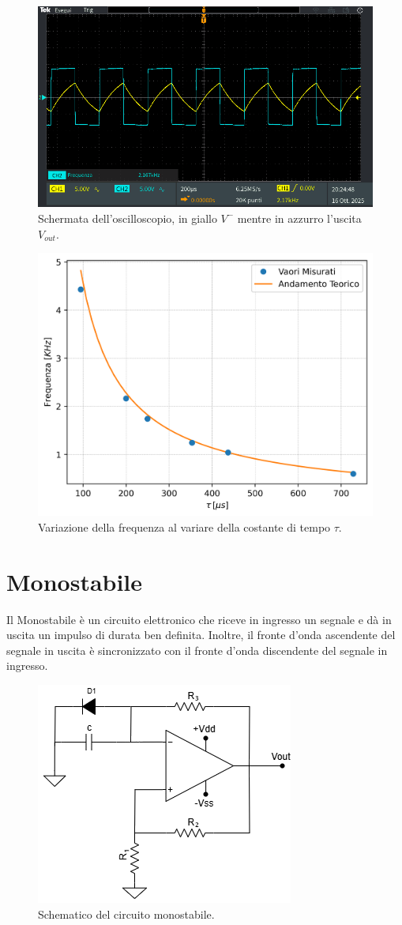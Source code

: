 \documentclass[a4paper,12pt]{article}
\begin{document}
\begin{figure}[h]
	\centering
	\includegraphics[width=0.7\linewidth]{immagini/ocillatore/oscillatore.PNG}
	\caption{Schermata dell'oscilloscopio, in giallo $V^-$ mentre in azzurro l'uscita $V_{out}$.}
	\label{fig:oscillatore}
\end{figure}

\begin{figure}[h]
	\centering
	\includegraphics[width=0.6\linewidth]{immagini/ocillatore/freq_tau.png}
	\caption{Variazione della frequenza al variare della costante di tempo $\tau$.}
	\label{fig:ocillatore_freq_tau}
\end{figure}
\FloatBarrier

\section*{Monostabile}
Il Monostabile è un circuito elettronico che riceve in ingresso un segnale e dà in uscita un impulso di durata ben definita.
Inoltre, il fronte d'onda ascendente del segnale in uscita è sincronizzato con il fronte d'onda discendente del segnale in ingresso.

\begin{figure}[h]
	\centering
	\includegraphics[width=0.4\linewidth]{immagini/monostabile/circuito_1.png}
	\caption{Schematico del circuito monostabile.}
	\label{fig:schematico_monostabile_1}
\end{figure}
\end{document}
